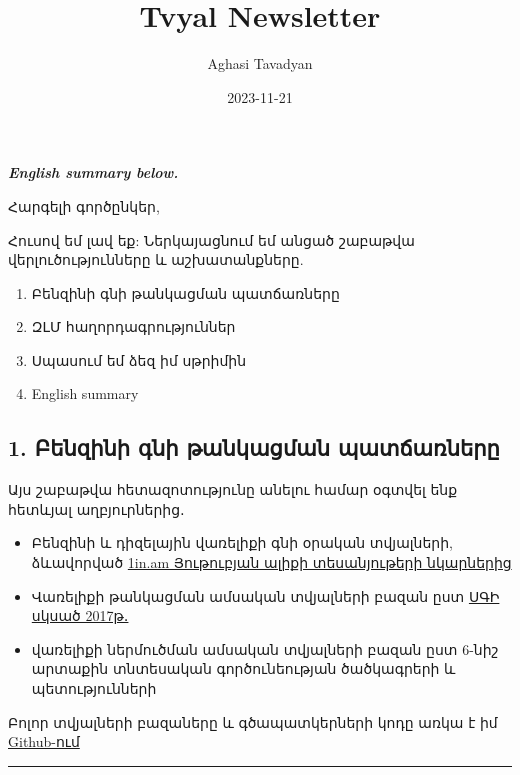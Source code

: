 \documentclass[
]{article}
\title{Tvyal Newsletter}
\author{Aghasi Tavadyan}
\date{2023-11-21}
\providecommand{\tightlist}{%
  \setlength{\itemsep}{0pt}\setlength{\parskip}{0pt}}
\begin{document}
\maketitle

\textbf{\emph{English summary below.}}

Հարգելի գործընկեր,

Հուսով եմ լավ եք: Ներկայացնում եմ անցած շաբաթվա վերլուծությունները և
աշխատանքները.

\begin{enumerate}
\def\labelenumi{\arabic{enumi}.}
\tightlist
\item
  Բենզինի գնի թանկացման պատճառները
\item
  ԶԼՄ հաղորդագրություններ
\item
  Սպասում եմ ձեզ իմ սթրիմին
\item
  English summary
\end{enumerate}

\hypertarget{ux562ux565ux576ux566ux56bux576ux56b-ux563ux576ux56b-ux569ux561ux576ux56fux561ux581ux574ux561ux576-ux57aux561ux57fux573ux561ux57cux576ux565ux580ux568}{%
\subsection{1. Բենզինի գնի թանկացման
պատճառները}\label{ux562ux565ux576ux566ux56bux576ux56b-ux563ux576ux56b-ux569ux561ux576ux56fux561ux581ux574ux561ux576-ux57aux561ux57fux573ux561ux57cux576ux565ux580ux568}}

Այս շաբաթվա հետազոտությունը անելու համար օգտվել ենք հետևյալ
աղբյուրներից․

\begin{itemize}
\tightlist
\item
  Բենզինի և դիզելային վառելիքի գնի օրական տվյալների, ձևավորված
  \href{https://img.youtube.com/vi/tV15O3Ilrc8/maxresdefault.jpg}{1in.am
  Յութուբյան ալիքի տեսանյութերի նկարներից}
\item
  Վառելիքի թանկացման ամսական տվյալների բազան ըստ
  \href{https://www.armstat.am/am/?nid=82\&id=2611}{ՍԳԻ սկսած 2017թ․}
\item
  վառելիքի ներմուծման ամսական տվյալների բազան ըստ 6-նիշ արտաքին
  տնտեսական գործունեության ծածկագրերի և պետությունների
\end{itemize}

Բոլոր տվյալների բազաները և գծապատկերների կոդը առկա է իմ
\href{https://github.com/tavad/tvyal_newsletter}{Github-ում}

\begin{center}\rule{0.5\linewidth}{0.5pt}\end{center}
\end{document}
